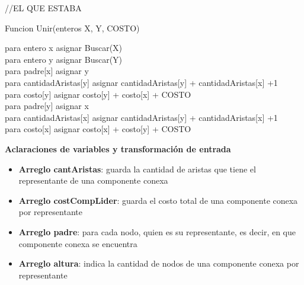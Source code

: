//EL QUE ESTABA


\begin{algorithm}[H] %
 \caption{Funcion Unir(enteros X, Y, COSTO)}
 	para entero x asignar Buscar(X)\\
 	para entero y asignar Buscar(Y)\\
	 {
	 	para padre[x] asignar y\\
 	para cantidadAristas[y] asignar cantidadAristas[y] + cantidadAristas[x] +1\\
 	para costo[y] asignar costo[y] + costo[x] + COSTO\\
	}{ 	 	para padre[y] asignar x\\
 	para cantidadAristas[x] asignar cantidadAristas[y] + cantidadAristas[x] +1\\
 	para costo[x] asignar costo[x] + costo[y] + COSTO\\	}
 
\end{algorithm}

\textbf{Aclaraciones de variables y transformaci\'on de entrada}

\begin{itemize}

\item {\bf Arreglo cantAristas}: guarda la cantidad de aristas que tiene el representante de una componente conexa
\item {\bf Arreglo costCompLider}: guarda el costo total de una componente conexa por representante 
\item {\bf Arreglo padre}: para cada nodo, quien es su representante, es decir, en que componente conexa se encuentra
\item {\bf Arreglo altura}: indica la cantidad de nodos de una componente conexa por representante
\end{itemize}  